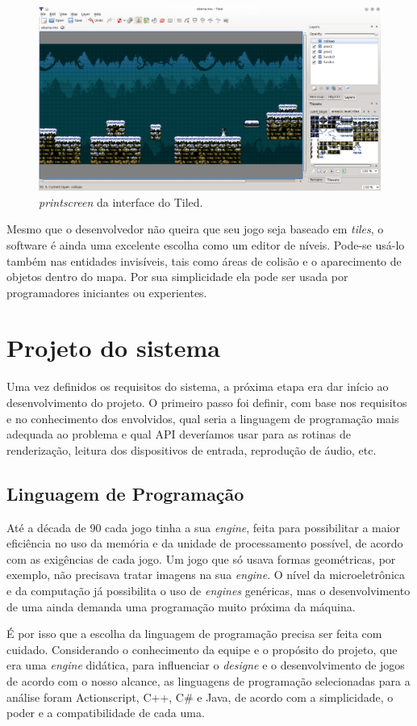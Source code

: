 \begin{figure}[H]
    \centering
		\caption{\textit{printscreen} da interface do Tiled.}
    \label{tiledGUI}
    \includegraphics[scale = 0.45]{Imagens/Tiled.png}
\end{figure}
%
\par
Mesmo que o desenvolvedor não queira que seu jogo seja baseado em \textit{tiles}, o software é ainda uma excelente escolha como um editor de níveis. Pode-se usá-lo também nas entidades invisíveis, tais como áreas de colisão e o aparecimento de objetos dentro do 
mapa. Por sua simplicidade ela pode ser usada por programadores iniciantes ou experientes.
%
%
%
%
\section{Projeto do sistema}
%
Uma vez definidos os requisitos do sistema, a próxima etapa era dar início ao desenvolvimento do projeto. O primeiro passo foi definir, com base nos requisitos e no conhecimento dos envolvidos, qual seria a linguagem de programação mais adequada ao problema e qual API deveríamos usar para as rotinas de renderização, leitura dos dispositivos de entrada, reprodução de áudio, etc.
%
%
\subsection{Linguagem de Programação}
\label{linguagem}
%
Até a década de 90 cada jogo tinha a sua \textit{engine}, feita para possibilitar a maior eficiência no uso da memória e da unidade de processamento possível, de acordo com as exigências de cada jogo. Um jogo que só usava formas geométricas, por exemplo, não precisava tratar imagens na sua \textit{engine}. O nível da microeletrônica e da computação já possibilita o uso de \textit{engines} genéricas, mas o desenvolvimento de uma ainda demanda uma programação muito próxima da máquina. 
\par
É por isso que a escolha da linguagem de programação precisa ser feita com cuidado. Considerando o conhecimento da equipe e o propósito do projeto, que era uma \textit{engine} didática, para influenciar o \textit{designe} e o desenvolvimento de jogos de acordo com o nosso alcance, as linguagens de programação selecionadas para a análise foram Actionscript, C++, C\# e Java, de acordo com a simplicidade, o poder e a compatibilidade de cada uma.
%
